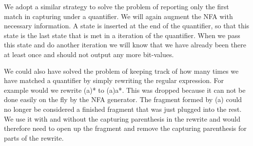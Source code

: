 
We adopt a similar strategy to solve the problem of reporting only the
first match in capturing under a quantifier. We will again augment the
NFA with necessary information. A state is inserted at the end of the
quantifier, so that this state is the last state that is met in a
iteration of the quantifier. When we pass this state and do another
iteration we will know that we have already been there at least once
and should not output any more bit-values.



We could also have solved the problem of keeping track of how many
times we have matched a quantifier by simply rewriting the regular
expression. For example would we rewrite \textsf{(a)*} to
\textsf{(\textbar a)a*}. This was dropped because it can not be done
easily on the fly by the NFA generator. The fragment formed by
\textsf{(a)} could no longer be considered a finished fragment that
was just plugged into the rest. We use it with and without the
capturing parenthesis in the rewrite and would therefore need to open
up the fragment and remove the capturing parenthesis for parts of the
rewrite.


